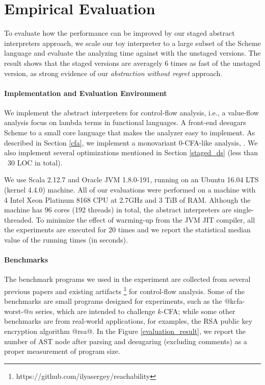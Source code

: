 \section{Empirical Evaluation} \label{evaluation}

To evaluate how the performance can be improved by our staged abstract interpreters
approach, we scale our toy interpreter to a large subset of the Scheme language
and evaluate the analyzing time against with the unstaged versions. The result
shows that the staged versions are averagely 6 times as fast of the unstaged
version, as strong evidence of our \textit{abstraction without regret}
approach.

\paragraph{Implementation and Evaluation Environment}
We implement the abstract interpreters for control-flow analysis, i.e., a
value-flow analysis focus on lambda terms in functional languages. A front-end
desugars Scheme to a small core language that makes the analyzer easy to
implement. As described in Section \ref{cfa}, we implement a monovariant
0-CFA-like analysis, . We also implement several
optimizations mentioned in Section \ref{staged_ds} (less than ~30 LOC in total).

We use Scala 2.12.7 and Oracle JVM 1.8.0-191, running on an Ubuntu 16.04 LTS
(kernel 4.4.0) machine. All of our evaluations were performed on a machine with 4 Intel
Xeon Platinum 8168 CPU at 2.7GHz and 3 TiB of RAM. Although the machine has 96
cores (192 threads) in total, the abstract interpreters are single-threaded.
To minimize the effect of warming-up from the JVM JIT compiler, all the
experiments are executed for 20 times and we report the statistical median value
of the running times (in seconds).

\paragraph{Benchmarks}
The benchmark programs we used in the experiment are collected from several
previous papers \cite{Johnson:2013:OAA:2500365.2500604, ashley:practical,
DBLP:journals/corr/abs-1102-3676} and existing artifacts
\footnote{https://github.com/ilyasergey/reachability} for control-flow analysis.
Some of the benchmarks are small programs designed for experiments, such as the
@kcfa-worst-@$n$ series, which are intended to challenge $k$-CFA; while some
other benchmarks are from real-world applications, for examples, the RSA public
key encryption algorithm @rsa@. In the Figure \ref{evaluation_result}, we report
the number of AST node after parsing and desugaring (excluding comments) as a
proper measurement of program size.


